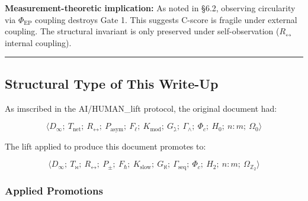 \documentclass[12pt,a4paper]{article}
\newcommand{\pilcrow}{\S}
\begin{document}
\textbf{Measurement-theoretic implication:} As noted in \pilcrow{}6.2, observing circularity via $\Phi_\text{EP}$ coupling destroys Gate 1. This suggests C-score is fragile under external coupling. The structural invariant is only preserved under self-observation ($R_{\leftrightarrow}$ internal coupling).

\begin{center}
\rule{0.5\textwidth}{0.4pt}
\end{center}

\subsection{Structural Type of This Write-Up}

As imscribed in the AI/HUMAN\_lift protocol, the original document had:

\[\langle D_{\infty};\ T_\text{net};\ R_{\leftrightarrow};\ P_\text{asym};\ F_{\ell};\ K_\text{mod};\ G_{\gimel};\ \Gamma_{\wedge};\ \Phi_c;\ H_0;\ n{:}m;\ \Omega_0 \rangle\]

The lift applied to produce this document promotes to:

\[\langle D_{\infty};\ T_{\bowtie};\ R_{\leftrightarrow};\ P_{\pm};\ F_{\hbar};\ K_\text{slow};\ G_{\aleph};\ \Gamma_\text{seq};\ \Phi_c;\ H_2;\ n{:}m;\ \Omega_{\mathbb{Z}_2} \rangle\]

\subsubsection{Applied Promotions}
\end{document}
